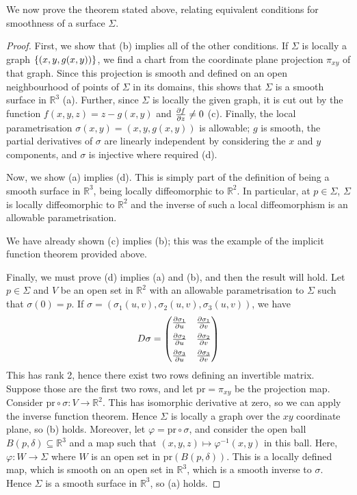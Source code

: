 \documentclass[a4paper]{article}
\begin{document}
We now prove the theorem stated above, relating equivalent conditions for smoothness of a surface \( \Sigma \).
\begin{proof}
	First, we show that (b) implies all of the other conditions.
	If \( \Sigma \) is locally a graph \( \qty{(x,y,g(x,y))} \), we find a chart from the coordinate plane projection \( \pi_{xy} \) of that graph.
	Since this projection is smooth and defined on an open neighbourhood of points of \( \Sigma \) in its domains, this shows that \( \Sigma \) is a smooth surface in \( \mathbb R^3 \) (a).
	Further, since \( \Sigma \) is locally the given graph, it is cut out by the function \( f(x,y,z) = z - g(x,y) \) and \( \pdv{f}{z} \neq 0 \) (c).
	Finally, the local parametrisation \( \sigma(x,y) = (x,y,g(x,y)) \) is allowable; \( g \) is smooth, the partial derivatives of \( \sigma \) are linearly independent by considering the \( x \) and \( y \) components, and \( \sigma \) is injective where required (d).

	Now, we show (a) implies (d).
	This is simply part of the definition of being a smooth surface in \( \mathbb R^3 \), being locally diffeomorphic to \( \mathbb R^2 \).
	In particular, at \( p \in \Sigma \), \( \Sigma \) is locally diffeomorphic to \( \mathbb R^2 \) and the inverse of such a local diffeomorphism is an allowable parametrisation.

	We have already shown (c) implies (b); this was the example of the implicit function theorem provided above.

	Finally, we must prove (d) implies (a) and (b), and then the result will hold.
	Let \( p \in \Sigma \) and \( V \) be an open set in \( \mathbb R^2 \) with an allowable parametrisation to \( \Sigma \) such that \( \sigma(0) = p \).
	If \( \sigma = (\sigma_1(u,v), \sigma_2(u,v), \sigma_3(u,v)) \), we have
	\[
		D\sigma = \begin{pmatrix}
			\pdv{\sigma_1}{u} & \pdv{\sigma_1}{v} \\[.5em]
			\pdv{\sigma_2}{u} & \pdv{\sigma_2}{v} \\[.5em]
			\pdv{\sigma_3}{u} & \pdv{\sigma_3}{v}
		\end{pmatrix}
	\]
	This has rank 2, hence there exist two rows defining an invertible matrix.
	Suppose those are the first two rows, and let \( \mathrm{pr} = \pi_{xy} \) be the projection map.
	Consider \( \mathrm{pr} \circ \sigma \colon V \to \mathbb R^2 \).
	This has isomorphic derivative at zero, so we can apply the inverse function theorem.
	Hence \( \Sigma \) is locally a graph over the \( xy \) coordinate plane, so (b) holds.
	Moreover, let \( \varphi = \mathrm{pr} \circ \sigma \), and consider the open ball \( B(p, \delta) \subseteq \mathbb R^3 \) and a map such that \( (x,y,z) \mapsto \varphi^{-1}(x,y) \) in this ball.
	Here, \( \varphi \colon W \to \Sigma \) where \( W \) is an open set in \( \mathrm{pr}(B(p, \delta)) \).
	This is a locally defined map, which is smooth on an open set in \( \mathbb R^3 \), which is a smooth inverse to \( \sigma \).
	Hence \( \Sigma \) is a smooth surface in \( \mathbb R^3 \), so (a) holds.
\end{proof}
\end{document}
